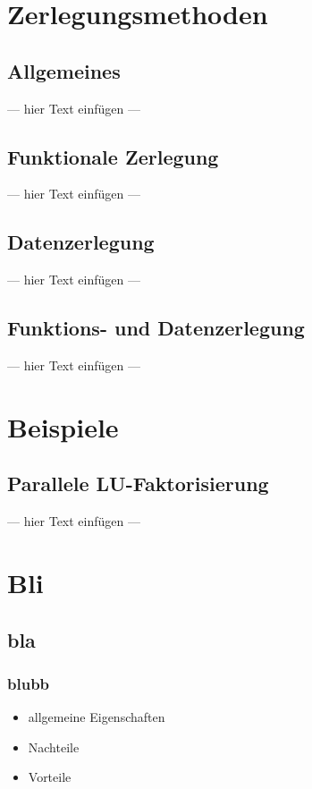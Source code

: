 \documentclass[a4paper, 12pt]{article}
\begin{document}
\section{Zerlegungsmethoden}


\subsection{Allgemeines}
--- hier Text einfügen ---


\subsection{Funktionale Zerlegung}
--- hier Text einfügen ---


\subsection{Datenzerlegung}
--- hier Text einfügen ---


\subsection{Funktions- und Datenzerlegung}
--- hier Text einfügen ---



\section{Beispiele}


\subsection{Parallele LU-Faktorisierung}
--- hier Text einfügen ---









\section{Bli}


\subsection{bla}

\subsubsection*{blubb}

\begin{itemize}
  \item allgemeine Eigenschaften
\end{itemize}
\begin{itemize}
  \renewcommand{\labelitemi}{\(-\)}%
  \item Nachteile
\end{itemize}
\begin{itemize}
  \renewcommand{\labelitemi}{+}%
  \item Vorteile
\end{itemize}
\end{document}
